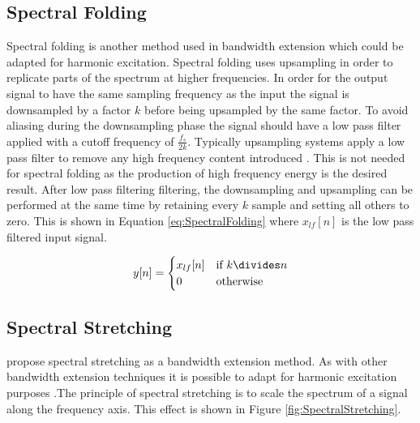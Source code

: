 	\subsection{Spectral Folding}
	\label{sec:Excitation-Methods-SpectralFolding}
		Spectral folding is another method used in bandwidth extension \citep{friedrich2007spectral} which could be
		adapted for harmonic excitation. Spectral folding uses upsampling in order to replicate parts of the
		spectrum at higher frequencies. In order for the output signal to have the same sampling frequency as the
		input the signal is downsampled by a factor $k$ before being upsampled by the same factor. To avoid aliasing
		during the downsampling phase the signal should have a low pass filter applied with a cutoff frequency of
		$\frac{f_{s}}{2k}$. Typically upsampling systems apply a low pass filter to remove any high frequency
		content introduced \citep{oppenheim2014discrete}. This is not needed for spectral folding as the production
		of high frequency energy is the desired result. After low pass filtering filtering, the downsampling and
		upsampling can be performed at the same time by retaining every $k$ sample and setting all others
		to zero. This is shown in Equation \ref{eq:SpectralFolding} where $x_{lf}[n]$ is the low pass filtered input
		signal.

		\begin{equation}
			y[n] = \begin{cases}
				x_{lf}[n] & \text{if $k \divides n$} \\
				0 & \text{otherwise}
			\end{cases}
			\label{eq:SpectralFolding}
		\end{equation}

	\subsection{Spectral Stretching}
	\label{sec:Excitation-Methods-SpectralStretching}
		\citet{nagel2009a} propose spectral stretching as a bandwidth extension method. As with other bandwidth
		extension techniques it is possible to adapt for harmonic excitation purposes .The principle of spectral
		stretching is to scale the spectrum of a signal along the frequency axis. This effect is shown in Figure
		\ref{fig:SpectralStretching}.

